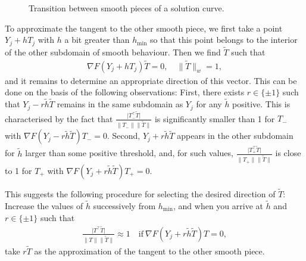 \documentclass[a4paper,11pt,english]{sphinxmanual}
\begin{document}
\begin{figure}[htbp]
\centering
\capstart

\noindent{}
\caption{Transition between smooth pieces of a solution curve.}\label{\detokenize{userdoc/model_continuation:id11}}\label{\detokenize{userdoc/model_continuation:ud-fig-transition}}\end{figure}

To approximate the tangent to the other smooth piece, we first take a point
\(Y_{j} + h T_{j}\) with \(h\) a bit greater than
\(h_{\mathrm{min}}\) so that this point belongs to the interior of the other
sub\sphinxhyphen{}domain of smooth behaviour. Then we find \(\tilde{T}\) such that
\begin{equation*}
\begin{split}\nabla F(Y_{j} + h T_{j}) \tilde{T} = 0,\quad \lVert \tilde{T} \rVert_{w} = 1,\end{split}
\end{equation*}
and it remains to determine an appropriate direction of this vector. This can be
done on the basis of the following observations:  First, there exists
\(r \in \{\pm 1\}\) such that \(Y_{j} - r \tilde{h} \tilde{T}\) remains
in the same sub\sphinxhyphen{}domain as \(Y_{j}\) for any \(\tilde{h}\) positive.
This is characterised by the fact that
\(\frac{\lvert T_{-}^{\top} \tilde{T}\rvert}{\lVert T_{-} \rVert \lVert \tilde{T} \rVert}\)
is significantly smaller than 1 for \(T_{-}\) with
\(\nabla F(Y_{j} - r \tilde{h} \tilde{T}) T_{-} = 0\). Second,
\(Y_{j} + r \tilde{h} \tilde{T}\) appears in the other sub\sphinxhyphen{}domain for
\(\tilde{h}\) larger than some positive threshold, and, for such values,
\(\frac{\lvert T_{+}^{\top} \tilde{T}\rvert}{\lVert T_{+} \rVert \lVert \tilde{T} \rVert}\)
is close to 1 for \(T_{+}\) with
\(\nabla F(Y_{j} + r \tilde{h} \tilde{T}) T_{+} = 0\).

This suggests the following procedure for selecting the desired direction of
\(\tilde{T}\): Increase the values of \(\tilde{h}\) successively from
\(h_{\mathrm{min}}\), and when you arrive at \(\tilde{h}\) and
\(r \in \{\pm 1\}\) such that
\begin{equation*}
\begin{split}\frac{\lvert T^{\top} \tilde{T}\rvert}{\lVert T \rVert \lVert \tilde{T} \rVert} \approx 1\quad \text{if}\ \nabla F(Y_{j} + r \tilde{h} \tilde{T}) T = 0,\end{split}
\end{equation*}
take \(r \tilde{T}\) as the approximation of the tangent to the other smooth
piece.
\end{document}
